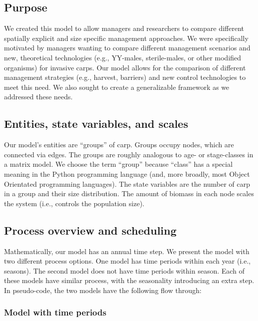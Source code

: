 \documentclass{article}[12pt]
\begin{document}
\subsection{Purpose}

We created this model to allow managers and researchers to compare different spatially explicit and size specific management approaches.
We were specifically motivated by managers wanting to compare different management scenarios and new, theoretical technologies (e.g., YY-males, sterile-males, or other modified organisms) for invasive carps. 
Our model allows for the comparison of different management strategies (e.g., harvest, barriers) and new control technologies to meet this need.
We also sought to create a generalizable framework as we addressed these needs. 

\subsection{Entities, state variables, and scales}

Our model's entities are ``groups'' of carp. 
Groups occupy nodes, which are connected via edges.
The groups are roughly analogous to age- or stage-classes in a matrix model.
We choose the term ``group'' because ``class'' has a special meaning in the Python programming language (and, more broadly, most Object Orientated programming languages). 
The state variables are the number of carp in a group and their size distribution.
The amount of biomass in each node scales the system (i.e., controls the population size). 

\subsection{Process overview and scheduling}

Mathematically, our model has an annual time step.
We present the model with two different process options.
One model has time periods within each year (i.e., seasons).
The second model does not have time periods within season. 
Each of these models have similar process, with the seasonality introducing an extra step. 
In pseudo-code, the two models have the following flow through: 

\subsubsection{Model with time periods}
\end{document}
